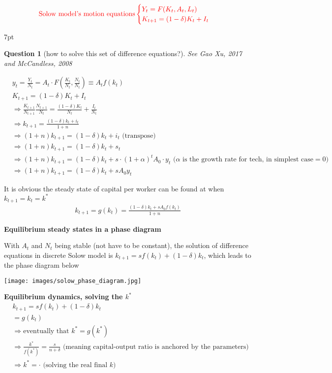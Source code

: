 \documentclass{article}
\newenvironment{redblock}{
\def\FrameCommand{
  \hspace{1pt}
    {\color{LightCoral}
    \vrule width 2pt}
    {\color{redshade}
    \vrule width 4pt}
  \colorbox{redshade}
}
\MakeFramed{
  \advance
  \hsize-
  \width
  \FrameRestore}
\noindent\hspace{-4.55pt}%
\begin{adjustwidth}{}{7pt}
\vspace{2pt}\vspace{2pt}
}
{\vspace{2pt}\end{adjustwidth}\endMakeFramed}
\newtheorem{question}{Question}
\begin{document}
\begin{align}
\color{red}
\text{Solow model's motion equations}\begin{cases}Y_{t}=F(K_{t},A_{t},L_{t}) \\
K_{t+1}=(1-\delta)K_{t}+I_{t} \\
\end{cases}
\end{align}

\begin{redblock}
\begin{question}[how to solve this set of difference equations?] 
See Gao Xu, 2017 and McCandless, 2008
\end{question}
\begin{align}
&y_t=\frac{Y_t}{N_t}=A_t \cdot F(\frac{K_t}{N_t},\frac{N_t}{N_t})\equiv A_t f(k_t)
\\&K_{t+1}=(1-\delta)K_t+I_t 
\\&\Rightarrow \frac{K_{t+1}}{N_{t+1}}\frac{N_{t+1}}{N_t}=\frac{(1-\delta)K_t}{N_t}+\frac{I_t}{N_t}
\\&\Rightarrow k_{t+1}=\frac{(1-\delta)k_t +i_t}{1+n}
\\&\Rightarrow (1+n)k_{t+1}=(1-\delta)k_t+i_t \text{ (transpose)}
\\&\Rightarrow(1+n)k_{t+1}=(1-\delta)k_t+s_t
\\&\Rightarrow(1+n)k_{t+1}=(1-\delta)k_t+s\cdot (1+\alpha)^t A_0 \cdot y_t \text{ ($\alpha$ is the growth rate for tech, in simplest case$=0$)}
\\&\Rightarrow(1+n)k_{t+1}=(1-\delta)k_t+s A_0 y_t
\end{align}

It is obvious the steady state of capital per worker can be found at when $k_{t+1}=k_t=k^*$
\begin{align}
k_{t+1}=g(k_t)=\frac{(1-\delta)k_t+s A_0 f(k_t)}{1+n}
\end{align}
\end{redblock}

\textbf{Equilibrium steady states in a phase diagram} 

With $A_{t}$ and $N_{t}$ being stable (not have to be constant), the solution of difference equations in discrete Solow model is $k_{t+1}=sf(k_{t})+(1-\delta)k_{t}$, which leads to the phase diagram below 

\texttt{[image: images/solow\_phase\_diagram.jpg]}


\textbf{Equilibrium dynamics, solving the $k^{*}$} 
\begin{align}
&k_{t+1}=sf(k_{t})+(1-\delta)k_{t}
\\&=g(k_{t})
\\&\Rightarrow \text{eventually that } k^{*}=g(k^{*})
\\& \Rightarrow \frac{k^{*}}{f(k^{*})}=\frac{s}{n+\delta} \text{ (meaning capital-output ratio is anchored by the parameters)}
\\&\Rightarrow k^{*}=\cdot \text{ (solving the real final } k \text{)}
\end{align}
\end{document}
